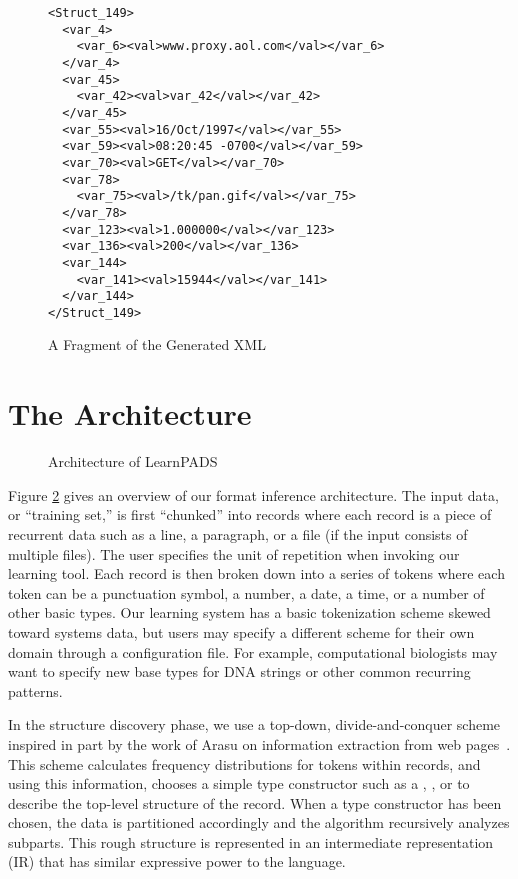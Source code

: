 \documentclass{sig-alternate-sigmod08}
\begin{document}
\begin{figure}
\begin{center}
{\small
\begin{verbatim}
<Struct_149>
  <var_4>
    <var_6><val>www.proxy.aol.com</val></var_6>
  </var_4>
  <var_45>
    <var_42><val>var_42</val></var_42>
  </var_45>
  <var_55><val>16/Oct/1997</val></var_55>
  <var_59><val>08:20:45 -0700</val></var_59>
  <var_70><val>GET</val></var_70>
  <var_78>
    <var_75><val>/tk/pan.gif</val></var_75>
  </var_78>
  <var_123><val>1.000000</val></var_123>
  <var_136><val>200</val></var_136>
  <var_144>
    <var_141><val>15944</val></var_141>
  </var_144>
</Struct_149>
\end{verbatim}
}
\caption{A Fragment of the Generated XML}\label{fig-xml}
\end{center}
\end{figure}

\section{The Architecture}
\begin{figure}
\begin{center}
\caption{Architecture of LearnPADS}
\vspace*{-5mm}
\label{fig-archi}
\end{center}
\end{figure}
Figure \ref{fig-archi} gives an overview of our format inference
architecture. The input data, or ``training set,'' 
is first ``chunked'' into records where
each record is a piece of recurrent data such as a line, 
a paragraph, or a file (if the input consists of multiple files).
The user specifies the unit of repetition when invoking our 
learning tool.
Each record is then broken down into a series of tokens where each
token can be a punctuation symbol, a number, a date, a time, or a number of other
basic types.  Our learning system has a basic tokenization scheme
skewed toward systems data, but users may specify a different scheme 
for their own domain through a configuration file.  For example,
computational biologists may want to specify new base types for DNA strings
or other common recurring patterns.

In the structure discovery phase, we use a top-down, divide-and-conquer
scheme inspired in part by the work of Arasu on
information extraction from web pages~\cite{arasu+:sigmod03}. 
This scheme calculates
frequency distributions for tokens within records, and using this information,
chooses a simple type constructor such as a , , or
 to describe the top-level structure of the record. 
When a type constructor has been chosen, the data is partitioned accordingly
and the algorithm recursively analyzes subparts.  This
rough structure is represented in an intermediate representation (IR)
that has similar expressive power to the \pads{} language. 
\end{document}
